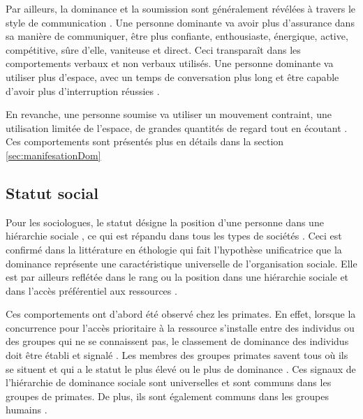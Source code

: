 Par ailleurs, la dominance et la soumission sont généralement révélées à travers le style de communication \cite{burgoon1998nature}. Une personne dominante va avoir plus d'assurance dans sa manière de communiquer, être plus confiante, enthousiaste, énergique, active, compétitive, sûre d'elle, vaniteuse et direct. Ceci transparaît dans les comportements verbaux et non verbaux utilisés. Une personne dominante va  utiliser plus d'espace, avec un temps de conversation plus long et être capable d'avoir plus d'interruption réussies \cite{burgoon1998nature}. 

En revanche, une personne soumise va utiliser un mouvement contraint, une utilisation limitée de l'espace, de grandes quantités de regard tout en écoutant  \cite{burgoon1998nature}. Ces comportements sont présentés plus en détails dans la section  \ref{sec:manifesationDom}


\subsection{Statut social}

	 Pour les sociologues, le statut désigne la position d'une personne dans une hiérarchie sociale \cite{ellyson1985power}, ce qui est répandu dans tous les types de sociétés \cite{lips1991women}.
	Ceci est confirmé  dans la littérature en éthologie qui fait l'hypothèse unificatrice que la dominance représente une caractéristique universelle de l'organisation sociale. Elle est par ailleurs reflétée dans le rang ou la position dans une hiérarchie sociale \cite{burgoon1998nature} et dans l'accès préférentiel aux ressources \cite{liska1990dominance}.
	
	Ces comportements ont d'abord été observé chez les primates. En effet, lorsque la concurrence pour l'accès prioritaire à la ressource s'installe entre des individus ou des groupes qui ne se connaissent pas, le classement de dominance des individus doit être établi et signalé \cite{burgoon1998nature}. Les membres des groupes primates savent tous où ils se situent et qui a le statut le plus élevé ou le plus de dominance \cite{smither1993authoritarianism}.
	Ces signaux de l'hiérarchie de dominance sociale sont universelles et sont communs dans les groupes de primates. De plus, ils sont également communs dans les groupes humains \cite{burgoon1998nature}.
	
